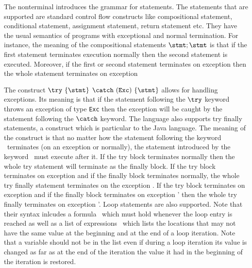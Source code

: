    The nonterminal \stmt{} introduces the grammar for statements.  
   The statements that are supported are standard control flow constructs like 
    compositional statement, conditional statement, assignment statement, return statement etc.
    They have the usual semantics of programs with exceptional and normal termination.
     For instance, the meaning of the compositional statements $\stmt;\stmt  $
    is that if the first statement terminates execution normally then the second statement is executed. Moreover, if the first or second statement 
    terminates on exception then the whole statement terminates on exception 
    
  The construct  $ \try  \ \{ \stmt \} $ $ \catch \ (\mbox{\rm\texttt{Exc}})\ \{ \stmt \}  $  allows for handling exceptions.
  Its meaning is that if the statement following the $ \try $ keyword throws an exception of type \texttt{Exc} then
  the exception will be caught by the statement following the  $ \catch $ keyword. The language also supports 
  try finally statements, a construct which is particular to the Java language.
  The meaning of the construct is that  no matter how the statement following the keyword \try \ terminates (on an exception or normally),
  the statement introduced by the keyword \finally \ must execute after it. If the try block terminates normally then the
  whole try statement will terminate as the finally block. If the try block terminates on exception \Exc{} and if the finally block
  terminates normally, the whole try finally statement terminates  on the exception  \Exc{}.  If the try block terminates on exception \Exc{} and if the finally block
  terminates on exception \Exc' then the whole try finally  terminates on exception \Exc'.
  Loop statements are also supported.  Note that their syntax inlcudes  a formula \invariant \ which must hold whenever 
  the loop entry is reached as well as a  list of expressions
  \modLoop \ which lists the locations that  may not have the same value at the beginning
  and at the end of a loop iteration. Note that a  variable should not be in the list \modLoop{} even if during a loop iteration its value is changed
  as far as at the end of the iteration the value it had in the beginning of the iteration is restored.


